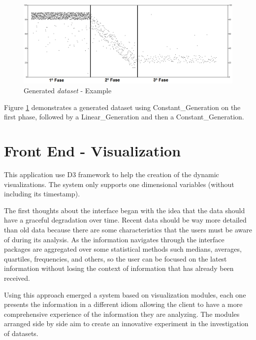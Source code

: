 \documentclass[letterpaper, 10 pt, conference]{ieeeconf}  %
\begin{document}
\begin{figure}[h]
    \centering
    \includegraphics[width=\linewidth]{Figures/exemplo_datageneration.png}
    \caption{Generated \textit{dataset} - Example}
        \label{fig:example_datageneration}
\end{figure}

Figure \ref{fig:example_datageneration} demonstrates a generated dataset using Constant\_Generation on the first phase, followed by a Linear\_Generation and then a Constant\_Generation.


\section{Front End - Visualization}
\label{section:frontend}
This application use D3 framework \cite{2011-d3} to help the creation of the dynamic visualizations. The system only supports one dimensional variables (without including its timestamp). 

The first thoughts about the interface began with the idea that the data should have a graceful degradation over time. Recent data should be way more detailed than old data because there are some characteristics that the users must be aware of during its analysis. As the information navigates through the interface packages are aggregated over some statistical methods such medians, averages, quartiles, frequencies, and others, so the user can be focused on the latest information without losing the context of information that has already been received.

Using this approach emerged a system based on visualization modules, each one presents the information in a different idiom allowing the client to have a more comprehensive experience of the information they are analyzing. The modules arranged side by side aim to create an innovative experiment in the investigation of datasets.
\end{document}
